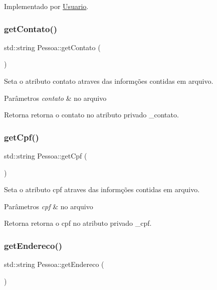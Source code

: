 Implementado por \mbox{\hyperlink{class_usuario_ad1fe8d76ca93b5505e72b1b6d50acca5}{Usuario}}.

\mbox{\label{class_pessoa_a909e765b8fa0cfa405211a9ac9a985c1}} 
\subsubsection{\texorpdfstring{getContato()}{getContato()}}
{\footnotesize\ttfamily std\+::string Pessoa\+::get\+Contato (\begin{DoxyParamCaption}{ }\end{DoxyParamCaption})}

Seta o atributo contato atraves das informções contidas em arquivo. 
\begin{DoxyParams}{Parâmetros}
{\em contato} & no arquivo \\
\hline
\end{DoxyParams}
\begin{DoxyReturn}{Retorna}
retorna o contato no atributo privado \+\_\+contato. 
\end{DoxyReturn}
\mbox{\label{class_pessoa_aac57d87193996bbe7420804f9ac298fb}} 
\subsubsection{\texorpdfstring{getCpf()}{getCpf()}}
{\footnotesize\ttfamily std\+::string Pessoa\+::get\+Cpf (\begin{DoxyParamCaption}{ }\end{DoxyParamCaption})}

Seta o atributo cpf atraves das informções contidas em arquivo. 
\begin{DoxyParams}{Parâmetros}
{\em cpf} & no arquivo \\
\hline
\end{DoxyParams}
\begin{DoxyReturn}{Retorna}
retorna o cpf no atributo privado \+\_\+cpf. 
\end{DoxyReturn}
\mbox{\label{class_pessoa_a2194fadbbd94e5220e29b4a12531f26c}} 
\subsubsection{\texorpdfstring{getEndereco()}{getEndereco()}}
{\footnotesize\ttfamily std\+::string Pessoa\+::get\+Endereco (\begin{DoxyParamCaption}{ }\end{DoxyParamCaption})}

